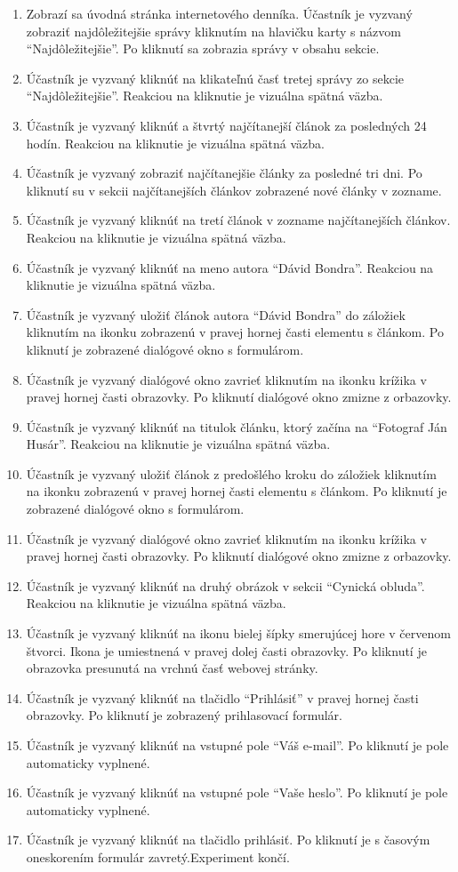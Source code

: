 {\small{}
\begin{enumerate}
\item Zobrazí sa úvodná stránka internetového denníka. Účastník je vyzvaný zobraziť najdôležitejšie správy kliknutím na hlavičku karty s názvom “Najdôležitejšie”. Po kliknutí sa zobrazia správy v obsahu sekcie.
\item Účastník je vyzvaný kliknúť na klikateľnú časť tretej správy zo sekcie “Najdôležitejšie”. Reakciou na kliknutie je vizuálna spätná väzba.
\item Účastník je vyzvaný kliknúť a štvrtý najčítanejší článok za posledných 24 hodín. Reakciou na kliknutie je vizuálna spätná väzba.
\item Účastník je vyzvaný zobraziť najčítanejšie články za posledné tri dni. Po kliknutí su v sekcii najčítanejších článkov zobrazené nové články v zozname.
\item Účastník je vyzvaný kliknúť na tretí článok v zozname najčítanejších článkov. Reakciou na kliknutie je vizuálna spätná väzba.
\item Účastník je vyzvaný kliknúť na meno autora “Dávid Bondra”. Reakciou na kliknutie je vizuálna spätná väzba.
\item Účastník je vyzvaný uložiť článok autora “Dávid Bondra” do záložiek kliknutím na ikonku zobrazenú v pravej hornej časti elementu s článkom. Po kliknutí je zobrazené dialógové okno s formulárom. 
\item Účastník je vyzvaný dialógové okno zavrieť kliknutím na ikonku krížika v pravej hornej časti obrazovky. Po kliknutí dialógové okno zmizne z orbazovky.
\item Účastník je vyzvaný kliknúť na titulok článku, ktorý začína na “Fotograf Ján Husár”. Reakciou na kliknutie je vizuálna spätná väzba.
\item Účastník je vyzvaný uložiť článok z predošlého kroku do záložiek kliknutím na ikonku zobrazenú v pravej hornej časti elementu s článkom. Po kliknutí je zobrazené dialógové okno s formulárom.
\item Účastník je vyzvaný dialógové okno zavrieť kliknutím na ikonku krížika v pravej hornej časti obrazovky. Po kliknutí dialógové okno zmizne z orbazovky.
\item Účastník je vyzvaný kliknúť na druhý obrázok v sekcii “Cynická obluda”. Reakciou na kliknutie je vizuálna spätná väzba.
\item Účastník je vyzvaný kliknúť na ikonu bielej šípky smerujúcej hore v červenom štvorci. Ikona je umiestnená v pravej dolej časti obrazovky. Po kliknutí je obrazovka presunutá na vrchnú časť webovej stránky.
\item Účastník je vyzvaný kliknúť na tlačidlo “Prihlásiť” v pravej hornej časti obrazovky. Po kliknutí je zobrazený prihlasovací formulár.
\item Účastník je vyzvaný kliknúť na vstupné pole “Váš e-mail”. Po kliknutí je pole automaticky vyplnené.
\item Účastník je vyzvaný kliknúť na vstupné pole “Vaše heslo”. Po kliknutí je pole automaticky vyplnené.
\item Účastník je vyzvaný kliknúť na tlačidlo prihlásiť. Po kliknutí je s časovým oneskorením formulár zavretý.Experiment končí.


\end{enumerate}}
